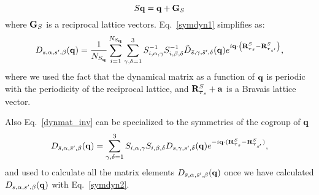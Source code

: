 \documentclass[12pt,a4paper,twoside]{report}
\begin{document}
\begin{equation}
S {\bf q} = {\bf q} + {\bf G}_S
\end{equation}
where ${\bf G}_S$ is a reciprocal lattice vectors.
Eq.~\ref{symdyn1} simplifies as:
\begin{equation}
D_{s,\alpha,s',\beta}({\bf q}) ={1\over N_{S_{\bf q}}}
\sum_{i=1}^{N_{S_{\bf q}}}
\sum_{\gamma,\delta=1}^3  S^{-1}_{i,\alpha,\gamma} S^{-1}_{i,\beta,\delta}
\tilde D_{\bar s,\gamma,\bar s',\delta}({\bf q})
e^{i {\bf q} \cdot \left( {\bf R}^{S}_{\boldsymbol{\tau}_s} - {\bf R}^{S}_{\boldsymbol{\tau}_{s'}} \right) },
\label{symdyn2}
\end{equation}
where we used the fact that the dynamical matrix as a function of ${\bf q}$ is periodic with the periodicity of the reciprocal lattice, and
${\bf R}^{S}_{\boldsymbol{\tau}_s}+{\bf a}$ is a
Bravais lattice vector.

Also Eq.~\ref{dynmat_inv} can be specialized to the symmetries of the cogroup of ${\bf q}$
\begin{equation}
D_{\bar s,\alpha,\bar s',\beta}({\bf q}) =
\sum_{\gamma,\delta=1}^3  S_{i,\alpha,\gamma} S_{i,\beta,\delta}
D_{s,\gamma,s',\delta}({\bf q})
e^{-i {\bf q} \cdot ({\bf R}^{S}_{\boldsymbol{\tau}_s} - {\bf R}^{S}_{\boldsymbol{\tau}_{s'}})},
\label{dynmat_inv_smallq}
\end{equation}
and used to calculate all the matrix elements  
$D_{\bar s,\alpha,\bar s',\beta}({\bf q})$ once
we have calculated 
$D_{s,\alpha,s',\beta}({\bf q})$ with Eq.~\ref{symdyn2}.
\end{document}

